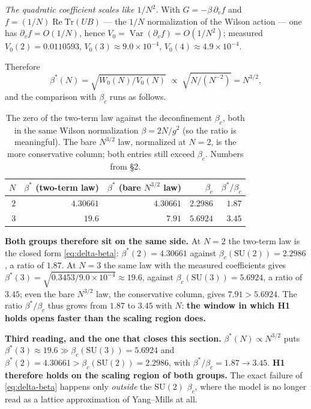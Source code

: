 \emph{The quadratic coefficient scales like $1/N^{2}$.} With $G=-\beta\,\partial_v f$ and
$f=(1/N)\operatorname{Re}\mathrm{Tr}(UB)$ --- the $1/N$ normalization of the Wilson action --- one has
$\partial_v f=O(1/N)$, hence $V_0=\operatorname{Var}(\partial_v f)=O(1/N^{2})$; measured
$V_0(2)=0.0110593$, $V_0(3)\approx9.0\times10^{-4}$, $V_0(4)\approx4.9\times10^{-4}$. \LE

Therefore
\begin{equation}
  \beta^{*}(N)=\sqrt{W_0(N)/V_0(N)}\;\propto\;\sqrt{N\big/(N^{-2})}=N^{3/2},
  \label{eq:n32}
\end{equation}
and the comparison with $\beta_c$ runs as follows.

\begin{table}[h]
\centering\footnotesize
\setlength{\tabcolsep}{6pt}
\renewcommand{\arraystretch}{1.1}
\begin{tabular}{@{}r r r r r@{}}
\toprule
$N$ & $\beta^{*}$ (two-term law) & $\beta^{*}$ (bare $N^{3/2}$ law) & $\beta_c$ & $\beta^{*}/\beta_c$\\
\midrule
$2$ & $\mathbf{4.30661}$ & $4.30661$ & $2.2986$ & $\mathbf{1.87}$\\
$3$ & $\mathbf{19.6}$ & $7.91$ & $5.6924$ & $\mathbf{3.45}$\\
\bottomrule
\end{tabular}
\caption{The zero of the two-term law against the deconfinement $\beta_c$, both in the same Wilson
normalization $\beta=2N/g^{2}$ (so the ratio is meaningful). The bare $N^{3/2}$ law, normalized at
$N=2$, is the more conservative column; both entries still exceed $\beta_c$. Numbers from
 \S2.}
\label{tab:betastar}
\end{table}

\noindent
\textbf{Both groups therefore sit on the same side.} At $N=2$ the two-term law is the closed form
\eqref{eq:delta-beta}: $\beta^{*}(2)=4.30661$ against $\beta_c(\mathrm{SU}(2))=2.2986$, a ratio of
$1.87$. At $N=3$ the same law with the measured coefficients gives
$\beta^{*}(3)=\sqrt{0.3453/9.0\times10^{-4}}\approx19.6$, against
$\beta_c(\mathrm{SU}(3))=5.6924$, a ratio of $3.45$; even the bare $N^{3/2}$ law, the conservative
column, gives $7.91>5.6924$. The ratio $\beta^{*}/\beta_c$ thus grows from $1.87$ to $3.45$ with $N$:
\textbf{the window in which H1 holds opens faster than the scaling region does.} \LE

\begin{keybox}
\textbf{Third reading, and the one that closes this section.} $\beta^{*}(N)\propto N^{3/2}$ puts
$\beta^{*}(3)\approx19.6\gg\beta_c(\mathrm{SU}(3))=5.6924$ and
$\beta^{*}(2)=4.30661>\beta_c(\mathrm{SU}(2))=2.2986$, with $\beta^{*}/\beta_c=1.87\to3.45$. \textbf{H1
therefore holds on the scaling region of both groups.} The exact failure of \eqref{eq:delta-beta} happens
only \emph{outside} the $\mathrm{SU}(2)$ $\beta_c$, where the model is no longer read as a lattice
approximation of Yang--Mills at all. \LE
\end{keybox}

